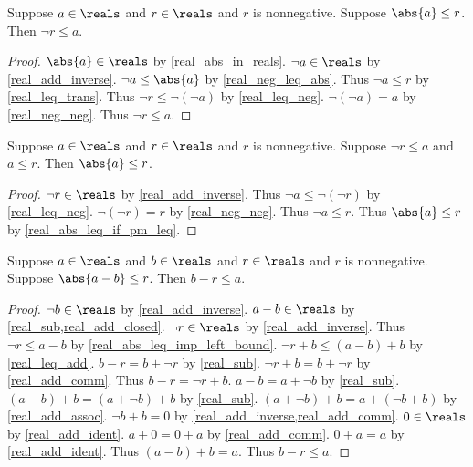 \begin{theorem}\label{real_abs_leq_imp_left_bound}
    Suppose $a\in\reals$ and $r\in\reals$ and $r$ is nonnegative.
    Suppose $\abs{a} \leq r$.
    Then $\neg{r} \leq a$.
\end{theorem}
\begin{proof}
    $\abs{a}\in\reals$ by \cref{real_abs_in_reals}.
    $\neg{a}\in\reals$ by \cref{real_add_inverse}.
    $\neg{a} \leq \abs{a}$ by \cref{real_neg_leq_abs}.
    Thus $\neg{a} \leq r$ by \cref{real_leq_trans}.
    Thus $\neg{r} \leq \neg{(\neg{a})}$ by \cref{real_leq_neg}.
    $\neg{(\neg{a})} = a$ by \cref{real_neg_neg}.
    Thus $\neg{r} \leq a$.
\end{proof}

\begin{theorem}\label{real_abs_leq_from_bounds}
    Suppose $a\in\reals$ and $r\in\reals$ and $r$ is nonnegative.
    Suppose $\neg{r} \leq a$ and $a \leq r$.
    Then $\abs{a} \leq r$.
\end{theorem}
\begin{proof}
    $\neg{r}\in\reals$ by \cref{real_add_inverse}.
    Thus $\neg{a} \leq \neg{(\neg{r})}$ by \cref{real_leq_neg}.
    $\neg{(\neg{r})} = r$ by \cref{real_neg_neg}.
    Thus $\neg{a} \leq r$.
    Thus $\abs{a} \leq r$ by \cref{real_abs_leq_if_pm_leq}.
\end{proof}

\begin{theorem}\label{real_abs_sub_leq_imp_left_bound}
    Suppose $a\in\reals$ and $b\in\reals$ and $r\in\reals$ and $r$ is nonnegative.
    Suppose $\abs{a - b} \leq r$.
    Then $b - r \leq a$.
\end{theorem}
\begin{proof}
    $\neg{b}\in\reals$ by \cref{real_add_inverse}.
    $a - b\in\reals$ by \cref{real_sub,real_add_closed}.
    $\neg{r}\in\reals$ by \cref{real_add_inverse}.
    Thus $\neg{r} \leq a - b$ by \cref{real_abs_leq_imp_left_bound}.
    $\neg{r} + b \leq (a - b) + b$ by \cref{real_leq_add}.
    $b - r = b + \neg{r}$ by \cref{real_sub}.
    $\neg{r} + b = b + \neg{r}$ by \cref{real_add_comm}.
    Thus $b - r = \neg{r} + b$.
    $a - b = a + \neg{b}$ by \cref{real_sub}.
    $(a - b) + b = (a + \neg{b}) + b$ by \cref{real_sub}.
    $(a + \neg{b}) + b = a + (\neg{b} + b)$ by \cref{real_add_assoc}.
    $\neg{b} + b = 0$ by \cref{real_add_inverse,real_add_comm}.
    $0\in\reals$ by \cref{real_add_ident}.
    $a + 0 = 0 + a$ by \cref{real_add_comm}.
    $0 + a = a$ by \cref{real_add_ident}.
    Thus $(a - b) + b = a$.
    Thus $b - r \leq a$.
\end{proof}

